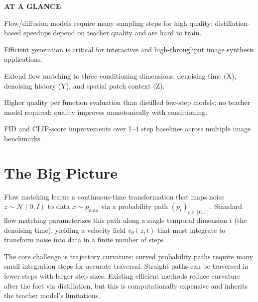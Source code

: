 \documentclass[10pt,twocolumn]{article}
\begin{document}
\begin{mdframed}[backgroundcolor=boxgray,linecolor=rulered,linewidth=1pt,
    innerleftmargin=6pt,innerrightmargin=6pt,
    innertopmargin=6pt,innerbottommargin=6pt]
\textbf{\small AT A GLANCE}\par\vspace{4pt}
\begin{description}[leftmargin=0pt,labelsep=4pt,itemsep=2pt,parsep=0pt,
    font=\small\bfseries]
  \item[Problem:] Flow/diffusion models require many sampling steps for high quality;
    distillation-based speedups depend on teacher quality and are hard to train.
  \item[Why it matters:] Efficient generation is critical for interactive and
    high-throughput image synthesis applications.
  \item[Method:] Extend flow matching to three conditioning dimensions: denoising
    time (X), denoising history (Y), and spatial patch context (Z).
  \item[Result:] Higher quality per function evaluation than distilled few-step
    models; no teacher model required; quality improves monotonically with conditioning.
  \item[Evidence:] FID and CLIP-score improvements over 1--4 step baselines across
    multiple image benchmarks.
\end{description}
\end{mdframed}

\section{The Big Picture}

Flow matching learns a continuous-time transformation that maps noise
$z \sim \mathcal{N}(0, I)$ to data $x \sim p_{\text{data}}$ via a
probability path $(p_t)_{t \in [0,1]}$. Standard flow matching parameterizes
this path along a single temporal dimension $t$ (the denoising time), yielding
a velocity field $v_\theta(z, t)$ that must integrate to transform noise into
data in a finite number of steps.

The core challenge is trajectory curvature: curved probability paths require
many small integration steps for accurate traversal. Straight paths can be
traversed in fewer steps with larger step sizes. Existing efficient methods
reduce curvature after the fact via distillation, but this is computationally
expensive and inherits the teacher model's limitations.
\end{document}
